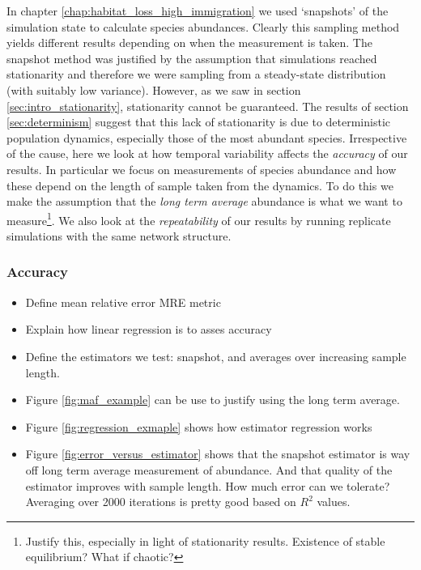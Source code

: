 In chapter \ref{chap:habitat_loss_high_immigration} we used  `snapshots' of the simulation state to calculate species abundances. Clearly this sampling method yields different results depending on when the measurement is taken. The snapshot method was justified by the assumption that simulations reached stationarity and therefore we were sampling from a steady-state distribution (with suitably low variance). However, as we saw in section \ref{sec:intro_stationarity}, stationarity cannot be guaranteed. The results of section \ref{sec:determinism} suggest that this lack of stationarity is due to deterministic population dynamics, especially those of the most abundant species. Irrespective of the cause, here we look at how temporal variability affects the \emph{accuracy} of our results. In particular we focus on measurements of species abundance and how these depend on the length of sample taken from the dynamics. To do this we make the assumption that the \emph{long term average} abundance is what we want to measure\footnote{Justify this, especially in light of stationarity results. Existence of stable equilibrium? What if chaotic?}. We also look at the \emph{repeatability} of our results by running replicate simulations with the same network structure.

\subsubsection{Accuracy}
%
%

\begin{itemize}
	\item Define mean relative error MRE metric
	\item Explain how linear regression is to asses accuracy
	\item Define the estimators we test: snapshot, and averages over increasing sample length. 
	\item Figure \ref{fig:maf_example} can be use to justify using the long term average.
	\item Figure \ref{fig:regression_exmaple} shows how estimator regression works
	\item Figure \ref{fig:error_versus_estimator} shows that the snapshot estimator is way off long term average measurement of abundance. And that quality of the estimator improves with sample length. How much error can we tolerate? Averaging over 2000 iterations is pretty good based on $R^2$ values.  
\end{itemize}

